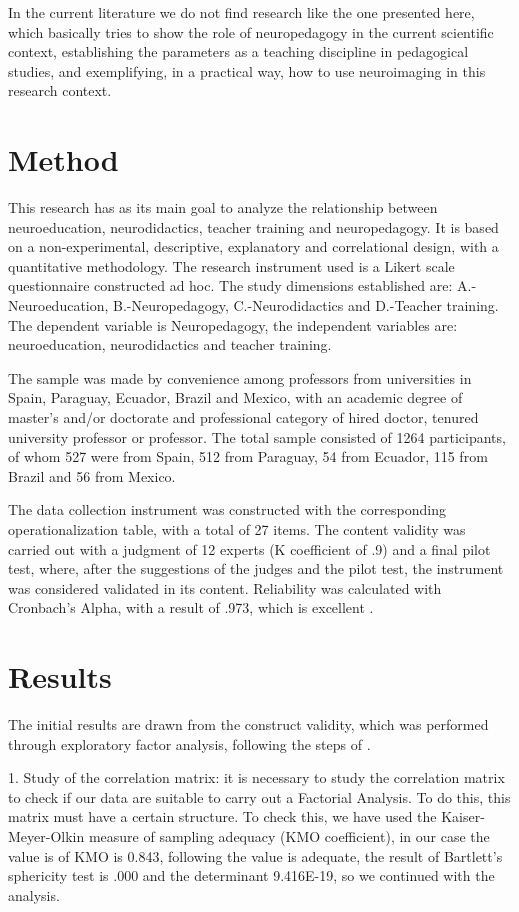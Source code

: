 \documentclass[english]{textolivre}
\begin{document}
In the current literature we do not find research like the one presented here, which basically tries to show the role of neuropedagogy in the current scientific context, establishing the parameters as a teaching discipline in pedagogical studies, and exemplifying, in a practical way, how to use neuroimaging in this research context.

\section{Method}\label{sec-normas}
This research has as its main goal to analyze the relationship between neuroeducation, neurodidactics, teacher training and neuropedagogy. It is based on a non-experimental, descriptive, explanatory and correlational design, with a quantitative methodology. The research instrument used is a Likert scale questionnaire constructed ad hoc. The study dimensions established are: A.-Neuroeducation, B.-Neuropedagogy, C.-Neurodidactics and D.-Teacher training. The dependent variable is Neuropedagogy, the independent variables are: neuroeducation, neurodidactics and teacher training.

The sample was made by convenience among professors from universities in Spain, Paraguay, Ecuador, Brazil and Mexico, with an academic degree of master's and/or doctorate and professional category of hired doctor, tenured university professor or professor. The total sample consisted of 1264 participants, of whom 527 were from Spain, 512 from Paraguay, 54 from Ecuador, 115 from Brazil and 56 from Mexico.

The data collection instrument was constructed with the corresponding operationalization table, with a total of 27 items. The content validity was carried out with a judgment of 12 experts (K coefficient of .9) and a final pilot test, where, after the suggestions of the judges and the pilot test, the instrument was considered validated in its content. Reliability was calculated with Cronbach's Alpha, with a result of .973, which is excellent \cite{george_spss_2003}.

\section{Results}\label{sec-conduta}
The initial results are drawn from the construct validity, which was performed through exploratory factor analysis, following the steps of \textcite{garcia_ferrando_alisis_2015}.

1. Study of the correlation matrix: it is necessary to study the correlation matrix to check if our data are suitable to carry out a Factorial Analysis. To do this, this matrix must have a certain structure. To check this, we have used the Kaiser-Meyer-Olkin measure of sampling adequacy (KMO coefficient), in our case the value is of KMO is 0.843, following \textcite{kaiser_index_1974} the value is adequate, the result of Bartlett's sphericity test is .000 and the determinant 9.416E-19, so we continued with the analysis.
\end{document}
